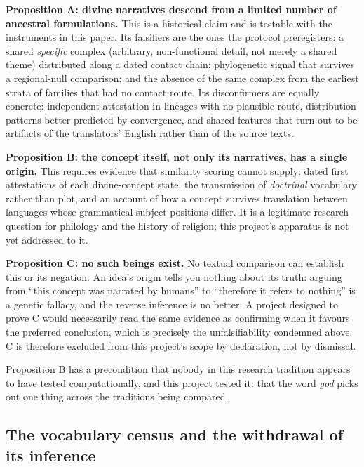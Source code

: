 \documentclass[11pt]{article}
\DeclareRobustCommand{\_}{\textunderscore\allowbreak}
\begin{document}
\textbf{Proposition A: divine narratives descend from a limited number of
ancestral formulations.} This is a historical claim and is testable with the
instruments in this paper. Its falsifiers are the ones the protocol
preregisters: a shared \emph{specific} complex (arbitrary, non-functional detail,
not merely a shared theme) distributed along a dated contact chain; phylogenetic
signal that survives a regional-null comparison; and the absence of the same
complex from the earliest strata of families that had no contact route. Its
disconfirmers are equally concrete: independent attestation in lineages with no
plausible route, distribution patterns better predicted by convergence, and
shared features that turn out to be artifacts of the translators' English rather
than of the source texts.

\textbf{Proposition B: the concept itself, not only its narratives, has a single
origin.} This requires evidence that similarity scoring cannot supply: dated
first attestations of each divine-concept state, the transmission of
\emph{doctrinal} vocabulary rather than plot, and an account of how a concept
survives translation between languages whose grammatical subject positions
differ. It is a legitimate research question for philology and the history of
religion; this project's apparatus is not yet addressed to it.

\textbf{Proposition C: no such beings exist.} No textual comparison can
establish this or its negation. An idea's origin tells you nothing about its
truth: arguing from ``this concept was narrated by humans'' to ``therefore it
refers to nothing'' is a genetic fallacy, and the reverse inference is no better.
A project designed to prove C would necessarily read the same evidence as
confirming when it favours the preferred conclusion, which is precisely the
unfalsifiability condemned above. C is therefore excluded from this project's
scope by declaration, not by dismissal.

Proposition B has a precondition that nobody in this research tradition appears
to have tested computationally, and this project tested it: that the word
\emph{god} picks out one thing across the traditions being compared.

\subsection{The vocabulary census and the withdrawal of its inference}
\end{document}
